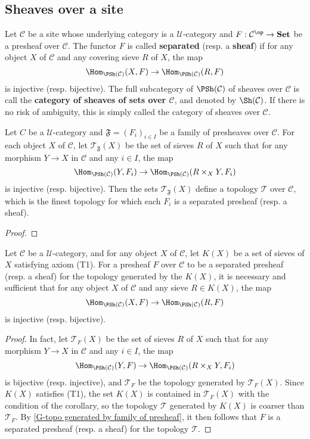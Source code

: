\subsection{Sheaves over a site}
Let $\mathcal{C}$ be a site whose underlying category is a $\mathscr{U}$-category and $F:\mathcal{C}^{\op}\to \mathbf{Set}$ be a presheaf over $\mathcal{C}$. The functor $F$ is called \textbf{separated} (resp. a \textbf{sheaf}) if for any object $X$ of $\mathcal{C}$ and any covering sieve $R$ of $X$, the map
\[\Hom_{\PSh(\mathcal{C})}(X,F)\to \Hom_{\PSh(\mathcal{C})}(R,F)\]
is injective (resp. bijective). The full subcategory of $\PSh(\mathcal{C})$ of sheaves over $\mathcal{C}$ is call the \textbf{category of sheaves of sets over $\mathcal{C}$}, and denoted by $\Sh(\mathcal{C})$. If there is no risk of ambiguity, this is simply called the category of sheaves over $\mathcal{C}$.
\begin{proposition}\label{G-topo generated by family of presheaf}
Let $C$ be a $\mathscr{U}$-category and $\mathfrak{F}=(F_i)_{i\in I}$ be a family of presheaves over $\mathcal{C}$. For each object $X$ of $\mathcal{C}$, let $\mathcal{T}_{\mathfrak{F}}(X)$ be the set of sieves $R$ of $X$ such that for any morphism $Y\to X$ in $\mathcal{C}$ and any $i\in I$, the map
\[\Hom_{\PSh(\mathcal{C})}(Y,F_i)\to \Hom_{\PSh(\mathcal{C})}(R\times_XY,F_i)\]
is injective (resp. bijective). Then the sets $\mathcal{T}_{\mathfrak{F}}(X)$ define a topology $\mathcal{T}$ over $\mathcal{C}$, which is the finest topology for which each $F_i$ is a separated presheaf (resp. a sheaf).
\end{proposition}
\begin{proof}

\end{proof}
\begin{corollary}\label{G-topo generated by morphism sheaf iff}
Let $\mathcal{C}$ be a $\mathscr{U}$-category, and for any object $X$ of $\mathcal{C}$, let $K(X)$ be a set of sieves of $X$ satisfying axiom (T1). For a presheaf $F$ over $\mathcal{C}$ to be a separated presheaf (resp. a sheaf) for the topology generated by the $K(X)$, it is necessary and sufficient that for any object $X$ of $\mathcal{C}$ and any sieve $R\in K(X)$, the map
\begin{equation}\label{G-topo generated by morphism sheaf iff-1}
\Hom_{\PSh(\mathcal{C})}(X,F)\to \Hom_{\PSh(\mathcal{C})}(R,F)
\end{equation}
is injective (resp. bijective).
\end{corollary}
\begin{proof}
In fact, let $\mathcal{T}_F(X)$ be the set of sieves $R$ of $X$ such that for any morphism $Y\to X$ in $\mathcal{C}$ and any $i\in I$, the map
\[\Hom_{\PSh(\mathcal{C})}(Y,F)\to \Hom_{\PSh(\mathcal{C})}(R\times_XY,F_i)\]
is bijective (resp. injective), and $\mathcal{T}_F$ be the topology generated by $\mathcal{T}_F(X)$. Since $K(X)$ satisfies (T1), the set $K(X)$ is contained in $\mathcal{T}_F(X)$ with the condition of the corollary, so the topology $\mathcal{T}$ generated by $K(X)$ is coarser than $\mathcal{T}_F$. By \cref{G-topo generated by family of presheaf}, it then follows that $F$ is a separated presheaf (resp. a sheaf) for the topology $\mathcal{T}$.
\end{proof}

